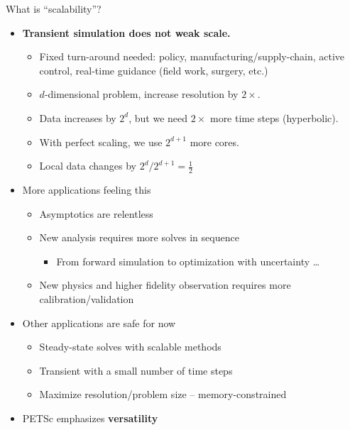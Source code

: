 \documentclass{beamer}
\begin{document}
\begin{frame}{What is ``scalability''?}
  \begin{itemize}
  \item {\bf Transient simulation does not weak scale.}
    \begin{itemize}
    \item Fixed turn-around needed: policy, manufacturing/supply-chain, active control, real-time guidance (field work, surgery, etc.)
    \item $d$-dimensional problem, increase resolution by $2\times$.
    \item Data increases by $2^d$, but we need $2\times$ more time steps (hyperbolic).
    \item With perfect scaling, we use $2^{d+1}$ more cores.
    \item Local data changes by $2^d / 2^{d+1} = \frac 1 2$
    \end{itemize}
  \item More applications feeling this
    \begin{itemize}
    \item Asymptotics are relentless
    \item New analysis requires more solves in sequence
      \begin{itemize}
      \item From forward simulation to optimization with uncertainty \ldots
      \end{itemize}
    \item New physics and higher fidelity observation requires more calibration/validation
    \end{itemize}
  \item Other applications are safe for now
    \begin{itemize}
    \item Steady-state solves with scalable methods
    \item Transient with a small number of time steps
    \item Maximize resolution/problem size -- memory-constrained
    \end{itemize}
  \item<2> \alert{PETSc emphasizes \textbf{versatility}}
  \end{itemize}
\end{frame}
\end{document}
